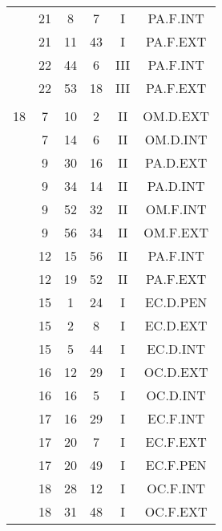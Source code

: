 \documentclass[12pt, a4paper]{article}
\begin{document}
\begin{multicols}{3}
{\begin{tabular}{c c c c c c}
	 	 	 	 & 21 & 8 & 7 & I & PA.F.INT\\%
	 	 	 	 & 21 & 11 & 43 & I & PA.F.EXT\\%
	 	 	 	 & 22 & 44 & 6 & III & PA.F.INT\\%
	 	 	 	 & 22 & 53 & 18 & III & PA.F.EXT\\%
	 	 	 	 & & & & & \\%
	 	 	 	18 & 7 & 10 & 2 & II & OM.D.EXT\\%
	 	 	 	 & 7 & 14 & 6 & II & OM.D.INT\\%
	 	 	 	 & 9 & 30 & 16 & II & PA.D.EXT\\%
	 	 	 	 & 9 & 34 & 14 & II & PA.D.INT\\%
	 	 	 	 & 9 & 52 & 32 & II & OM.F.INT\\%
	 	 	 	 & 9 & 56 & 34 & II & OM.F.EXT\\%
	 	 	 	 & 12 & 15 & 56 & II & PA.F.INT\\%
	 	 	 	 & 12 & 19 & 52 & II & PA.F.EXT\\%
	 	 	 	 & 15 & 1 & 24 & I & EC.D.PEN\\%
	 	 	 	 & 15 & 2 & 8 & I & EC.D.EXT\\%
	 	 	 	 & 15 & 5 & 44 & I & EC.D.INT\\%
	 	 	 	 & 16 & 12 & 29 & I & OC.D.EXT\\%
	 	 	 	 & 16 & 16 & 5 & I & OC.D.INT\\%
	 	 	 	 & 17 & 16 & 29 & I & EC.F.INT\\%
	 	 	 	 & 17 & 20 & 7 & I & EC.F.EXT\\%
	 	 	 	 & 17 & 20 & 49 & I & EC.F.PEN\\%
	 	 	 	 & 18 & 28 & 12 & I & OC.F.INT\\%
	 	 	 	 & 18 & 31 & 48 & I & OC.F.EXT\\%

\end{tabular}}
\end{multicols}
\end{document}
